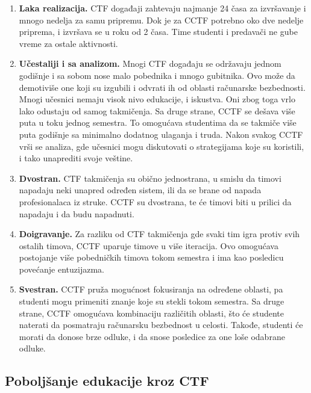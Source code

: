 \documentclass[12pt, a4paper, twocolumn]{article}
\begin{document}
\begin{enumerate}
    \item \textbf{Laka realizacija.} CTF događaji zahtevaju najmanje 24 časa 
        za izvršavanje i mnogo nedelja za samu pripremu. Dok je za CCTF 
        potrebno oko dve nedelje priprema, i izvršava se u roku od 2 časa. 
        Time studenti i predavači ne gube vreme za ostale aktivnosti.
    \item \textbf{Učestaliji i sa analizom.} Mnogi CTF događaju se održavaju
        jednom godišnje i sa sobom nose malo pobednika i mnogo gubitnika.
        Ovo može da demotiviše one koji su izgubili i odvrati ih od oblasti
        računarske bezbednosti. Mnogi učesnici nemaju visok nivo edukacije,
        i iskustva. Oni zbog toga vrlo lako odustaju od samog takmičenja.
        Sa druge strane, CCTF se dešava više puta u toku jednog semestra.
        To omogućava studentima da se takmiče više puta godišnje sa minimalno
        dodatnog ulaganja i truda. Nakon svakog CCTF vrši se analiza, gde
        učesnici mogu diskutovati o strategijama koje su koristili, i tako
        unaprediti svoje veštine.
    \item \textbf{Dvostran.}
        CTF takmičenja su obično jednostrana, u smislu da timovi napadaju
        neki unapred određen sistem, ili da se brane od napada profesionalaca
        iz struke. CCTF su dvostrana, te će timovi biti u prilici da napadaju
        i da budu napadnuti. 
    \item \textbf{Doigravanje.}
        Za razliku od CTF takmičenja gde svaki tim igra protiv svih ostalih
        timova, CCTF uparuje timove u više iteracija. Ovo omogućava postojanje
        više pobedničkih timova tokom semestra i ima kao posledicu povećanje
        entuzijazma.
    \item \textbf{Svestran.}
        CCTF pruža mogućnost fokusiranja na određene oblasti, pa studenti
        mogu primeniti znanje koje su stekli tokom semestra. Sa druge strane,
        CCTF omogućava kombinaciju različitih oblasti, što će studente 
        naterati da posmatraju računarsku bezbednost u celosti. Takođe, 
        studenti će morati da donose brze odluke, i da snose posledice za one
        loše odabrane odluke.
\end{enumerate}

\subsection{Poboljšanje edukacije kroz CTF}
\end{document}
